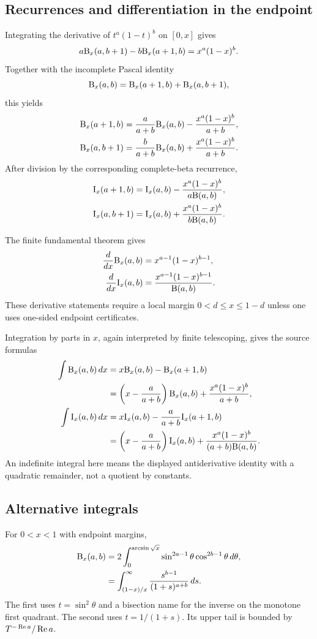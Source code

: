 \subsection{Recurrences and differentiation in the endpoint}

Integrating the derivative of $t^a(1-t)^b$ on $[0,x]$ gives
\[
 a\mathrm B_x(a,b+1)-b\mathrm B_x(a+1,b)=x^a(1-x)^b.
\]
Together with the incomplete Pascal identity
\[
 \mathrm B_x(a,b)=\mathrm B_x(a+1,b)+\mathrm B_x(a,b+1),
\]
this yields
\begin{align}
 \mathrm B_x(a+1,b)
 &=\frac{a}{a+b}\mathrm B_x(a,b)
   -\frac{x^a(1-x)^b}{a+b},
 \label{eq:inc-left-rec}\\
 \mathrm B_x(a,b+1)
 &=\frac{b}{a+b}\mathrm B_x(a,b)
   +\frac{x^a(1-x)^b}{a+b}.
 \label{eq:inc-right-rec}
\end{align}
After division by the corresponding complete-beta recurrence,
\begin{align}
 \mathrm I_x(a+1,b)
 &=\mathrm I_x(a,b)-\frac{x^a(1-x)^b}{a\mathrm B(a,b)},\\
 \mathrm I_x(a,b+1)
 &=\mathrm I_x(a,b)+\frac{x^a(1-x)^b}{b\mathrm B(a,b)}.
\end{align}

The finite fundamental theorem gives
\begin{align}
 \frac{d}{dx}\mathrm B_x(a,b)&=x^{a-1}(1-x)^{b-1},\\
 \frac{d}{dx}\mathrm I_x(a,b)&=
 \frac{x^{a-1}(1-x)^{b-1}}{\mathrm B(a,b)}.
\end{align}
These derivative statements require a local margin $0<d\le x\le1-d$ unless one uses one-sided endpoint certificates.

Integration by parts in $x$, again interpreted by finite telescoping, gives the source formulas
\begin{align*}
 \int\mathrm B_x(a,b)\,dx
 &=x\mathrm B_x(a,b)-\mathrm B_x(a+1,b)\\
 &=\left(x-\frac{a}{a+b}\right)\mathrm B_x(a,b)
   +\frac{x^a(1-x)^b}{a+b},\\
 \int\mathrm I_x(a,b)\,dx
 &=x\mathrm I_x(a,b)-\frac{a}{a+b}\mathrm I_x(a+1,b)\\
 &=\left(x-\frac{a}{a+b}\right)\mathrm I_x(a,b)
   +\frac{x^a(1-x)^b}{(a+b)\mathrm B(a,b)}.
\end{align*}
An indefinite integral here means the displayed antiderivative identity with a quadratic remainder, not a quotient by constants.

\subsection{Alternative integrals}

For $0<x<1$ with endpoint margins,
\begin{align}
 \mathrm B_x(a,b)
 &=2\int_0^{\arcsin\sqrt{x}}
   \sin^{2a-1}\theta\cos^{2b-1}\theta\,d\theta,
 \label{eq:inc-trig}\\
 &=\int_{(1-x)/x}^{\infty}
   \frac{s^{b-1}}{(1+s)^{a+b}}\,ds.
 \label{eq:inc-infinity}
\end{align}
The first uses $t=\sin^2\theta$ and a bisection name for the inverse on the monotone first quadrant.  The second uses $t=1/(1+s)$.  Its upper tail is bounded by $T^{-\operatorname{Re} a}/\operatorname{Re} a$.

